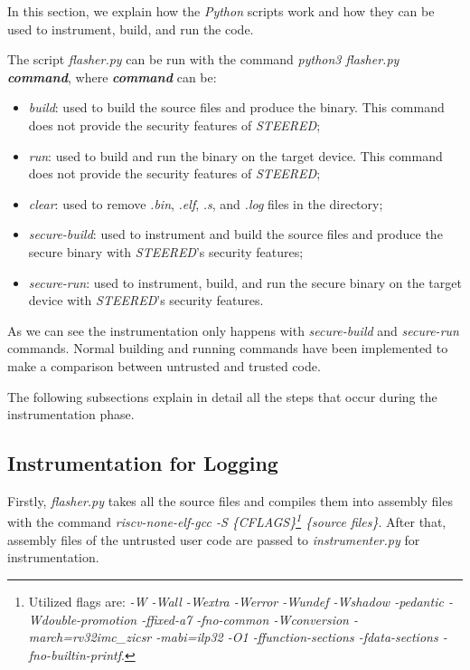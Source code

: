 In this section, we explain how the \textit{Python} scripts work and how they can
be used to instrument, build, and run the code.

The script \textit{flasher.py} can be run with the command \textit{python3
flasher.py \textbf{command}}, where \textit{\textbf{command}} can be:
\begin{itemize}[noitemsep]
  \item \textit{build}: used to build the source files and produce the binary.
    This command does not provide the security features of \textit{STEERED};

  \item \textit{run}: used to build and run the binary on the target device.
    This command does not provide the security features of \textit{STEERED};

  \item \textit{clear}: used to remove \textit{.bin}, \textit{.elf}, \textit{.s},
    and \textit{.log} files in the directory;

  \item \textit{secure-build}: used to instrument and build the source files and
    produce the secure binary with \textit{STEERED}'s security features;

  \item \textit{secure-run}: used to instrument, build, and run the secure binary
    on the target device with \textit{STEERED}'s security features.
\end{itemize}

As we can see the instrumentation only happens with \textit{secure-build} and
\textit{secure-run} commands. Normal building and running commands have been
implemented to make a comparison between untrusted and trusted code.

The following subsections explain in detail all the steps that occur during the
instrumentation phase.

\subsection{Instrumentation for Logging}
\label{subsec:logging}

Firstly, \textit{flasher.py} takes all the source files and compiles them into assembly
files with the command \textit{riscv-none-elf-gcc -S \{CFLAGS\}\footnote{Utilized
flags are: \textit{-W -Wall -Wextra -Werror -Wundef -Wshadow -pedantic -Wdouble-promotion
-ffixed-a7 -fno-common -Wconversion -march=rv32imc\_zicsr -mabi=ilp32 -O1 -ffunction-sections
-fdata-sections -fno-builtin-printf}.} \{source files\}}. After that, assembly
files of the untrusted user code are passed to \textit{instrumenter.py} for instrumentation.

